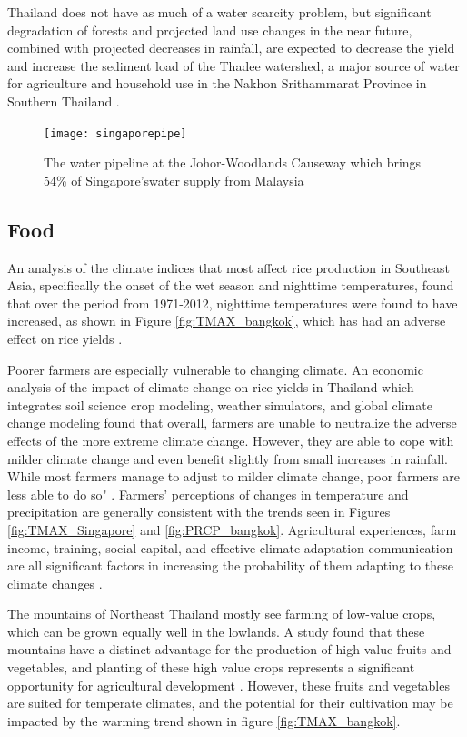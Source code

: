 Thailand does not have as much of a water scarcity problem, but significant degradation of forests and projected land use changes in the near future, combined with projected decreases in rainfall, are expected to decrease the yield and increase the sediment load of the Thadee watershed, a major source of water for agriculture and household use in the Nakhon Srithammarat Province in Southern Thailand \citep{landuse}. 

\begin{figure}
  \texttt{[image: singaporepipe]}
  \caption{The water pipeline at the Johor-Woodlands Causeway which brings 54\% of Singapore'swater supply from Malaysia\citep{shaaz2008}}
  \label{fig:waterpipe}
\end{figure}

\subsection{Food}
An analysis of the climate indices that most affect rice production in Southeast Asia, specifically the onset of the wet season and nighttime temperatures, found that over the period from 1971-2012, nighttime temperatures were found to have increased, as shown in Figure \ref{fig:TMAX_bangkok}, which has had an adverse effect on rice yields \citep{riceindices}. 

Poorer farmers are especially vulnerable to changing climate. An economic analysis of the impact of climate change on rice yields in Thailand which integrates soil science crop modeling, weather simulators, and global climate change modeling found that overall, farmers are unable to neutralize the adverse effects of the more extreme climate change. However, they are able to cope with milder climate change and even benefit slightly from small increases in rainfall. While most farmers manage to adjust to milder climate change, poor farmers are less able to do so" \citep{climatechangerice}. Farmers' perceptions of changes in temperature and precipitation are generally consistent with the trends seen in Figures \ref{fig:TMAX_Singapore} and \ref{fig:PRCP_bangkok}. Agricultural experiences, farm income, training, social capital, and effective climate adaptation communication are all significant factors in increasing the probability of them adapting to these climate changes \citep{farmerintention}.

The mountains of Northeast Thailand mostly see farming of low-value crops, which can be grown equally well in the lowlands. A study found that these mountains have a distinct advantage for the production of high-value fruits and vegetables, and planting of these high value crops represents a significant opportunity for agricultural development \citep{mountains}.  However, these fruits and vegetables are suited for temperate climates, and the potential for their cultivation may be impacted by the warming trend shown in figure \ref{fig:TMAX_bangkok}. 

